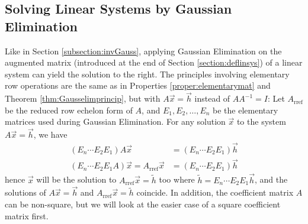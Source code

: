 \subsection{Solving Linear Systems by Gaussian Elimination}
\label{subsection:SolLinSysGauss}

Like in Section \ref{subsection:invGauss}, applying Gaussian Elimination on the augmented matrix (introduced at the end of Section \ref{section:deflinsys}) of a linear system can yield the solution to the right. The principles involving elementary row operations are the same as in Properties \ref{proper:elementarymat} and Theorem \ref{thm:Gausselimprincip}, but with $A\vec{x} = \vec{h}$ instead of $AA^{-1} = I$: Let $A_{\text{rref}}$ be the reduced row echelon form of $A$, and $E_1, E_2, \ldots, E_n$ be the elementary matrices used during Gaussian Elimination. For any solution $\vec{x}$ to the system $A\vec{x} = \vec{h}$, we have
\begin{align*}
(E_n\cdots E_2E_1)A\vec{x} &= (E_n\cdots E_2E_1)\vec{h} \\
(E_n\cdots E_2E_1A)\vec{x} = A_{\text{rref}}\vec{x} &= (E_n\cdots E_2E_1)\vec{h} 
\end{align*}
hence $\vec{x}$ will be the solution to $A_{\text{rref}}\vec{x} = \tilde{h}$ too where $\tilde{h} = E_n\cdots E_2E_1\vec{h}$, and the solutions of $A\vec{x} = \vec{h}$ and $A_{\text{rref}}\vec{x} = \tilde{h}$ coincide. In addition, the coefficient matrix $A$ can be non-square, but we will look at the easier case of a square coefficient matrix first.

